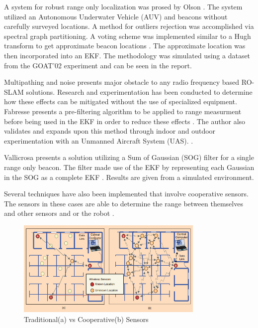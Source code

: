 \documentclass[conference]{IEEEtran}
\begin{document}
A system for robust range only localization was prosed by Olson \cite{Olson2006}. The system utilized an Autonomous Underwater Vehicle (AUV) and beacons without carefully surveyed locations. A method for outliers rejection was accomplished via spectral graph partitioning. A voting scheme was implemented similar to a Hugh transform to get approximate beacon locations \cite{Hough1959}. The approximate location was then incorporated into an EKF. The methodology was simulated using a dataset from the GOAT'02 experiment and can be seen in the report. %


Multipathing and noise presents major obstacle to any radio frequency based RO-SLAM solutions. Research and experimentation has been conducted to determine how these effects can be mitigated without the use of specialized equipment. Fabresse presents a pre-filtering algorithm to be applied to range measurment before being used in the EKF in order to reduce these effects \cite{Fabresse2014}. The author also validates and expands upon this method through indoor and outdoor experimentation with an Unmanned Aircraft System (UAS). \cite{Fabresse2016}. 


Vallicrosa presents a solution utilizing a Sum of Gaussian (SOG) filter for a single range only beacon. The filter made use of the EKF by representing each Gaussian in the SOG as a complete EKF \cite{Vallicrosa2015}. Results are given from a simulated environment.

Several techniques have also been implemented that involve cooperative sensors. The sensors in these cases are able to determine the range between themselves and other sensors and or the robot \cite{Patwari2005}.

\begin{figure}[h!]
	\centering
	\includegraphics[width=90mm]{coop_loc_comp_patwari.png}
	\caption{Traditional(a) vs Cooperative(b) Sensors \cite{Patwari2005}}
	\label{trad_vs_coop_sensors}
\end{figure}
\end{document}
